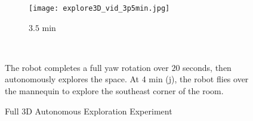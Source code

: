 \begin{figure}[!t]
{	\hspace*{0.02\columnwidth}
	\begin{subfigure}[t]{0.3\columnwidth}
           	\centering
          	\texttt{[image: explore3D\_vid\_3p5min.jpg]}
        		\caption{$3.5$ min}
    	\end{subfigure}
}
\\
	\caption{Full 3D Autonomous Exploration Experiment}
	\medskip
	\small
	The robot completes a full yaw rotation over $20$ seconds, then autonomously explores the space. At $4$ min (j), the robot flies over the mannequin to explore the southeast corner of the room.
	\label{fig:exp3DVid}
\end{figure}



